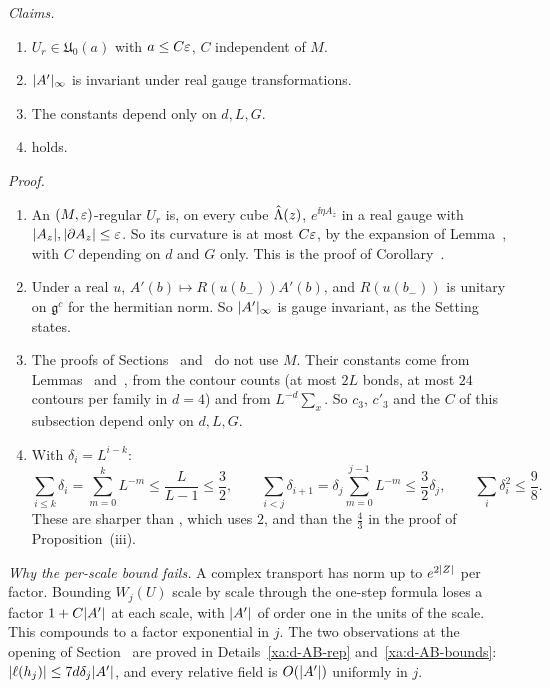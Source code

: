 \begin{detail}\label{xa:d-AB-setting}
\emph{Claims.}
\begin{enumerate}[label=(\alph*)]
\item $U_r\in\mathfrak U_0(a)$ with $a\le C\varepsilon$, $C$ independent of $M$.
\item $\lvert A'\rvert_\infty$ is invariant under real gauge transformations.
\item The constants depend only on $d,L,G$.
\item {} holds.
\end{enumerate}

\emph{Proof.}
\begin{enumerate}[label=(\alph*)]
\item An $(M,\varepsilon)$-regular $U_r$ is, on every cube $\hat{\Lambda}(z)$, $e^{\ii\eta A_z}$ in a real gauge with $\lvert A_z\rvert,\lvert\partial A_z\rvert\le\varepsilon$. So its curvature is at most $C\varepsilon$, by the expansion of Lemma~, with $C$ depending on $d$ and $G$ only. This is the proof of Corollary~.
\item Under a real $u$, $A'(b)\mapsto R(u(b_-))A'(b)$, and $R(u(b_-))$ is unitary on $\mathfrak g^c$ for the hermitian norm. So $\lvert A'\rvert_\infty$ is gauge invariant, as the Setting states.
\item The proofs of Sections~ and~ do not use $M$. Their constants come from Lemmas~ and~, from the contour counts (at most $2L$ bonds, at most $24$ contours per family in $d=4$) and from $L^{-d}\sum_x$. So $c_3$, $c'_3$ and the $C$ of this subsection depend only on $d,L,G$.
\item With $\delta_i=L^{i-k}$:
\[
\sum_{i\le k}\delta_i=\sum_{m=0}^kL^{-m}\le\frac L{L-1}\le\frac32,\qquad\sum_{i<j}\delta_{i+1}=\delta_j\sum_{m=0}^{j-1}L^{-m}\le\frac32\delta_j,\qquad\sum_i\delta_i^2\le\frac98 .
\]
These are sharper than , which uses $2$, and than the $\frac43$ in the proof of Proposition~(iii).
\end{enumerate}

\emph{Why the per-scale bound fails.} A complex transport has norm up to $e^{2\lvert Z\rvert}$ per factor. Bounding $W_j(U)$ scale by scale through the one-step formula loses a factor $1+C\lvert A'\rvert$ at each scale, with $\lvert A'\rvert$ of order one in the units of the scale. This compounds to a factor exponential in $j$. The two observations at the opening of Section~ are proved in Details~\ref{xa:d-AB-rep} and~\ref{xa:d-AB-bounds}: $\lvert\ell(h_j)\rvert\le7d\delta_j\lvert A'\rvert$, and every relative field is $O(\lvert A'\rvert)$ uniformly in $j$.
\end{detail}

